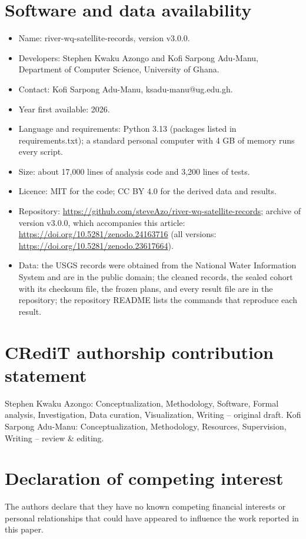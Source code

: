 \section*{Software and data availability}
\begin{itemize}
\item Name: river-wq-satellite-records, version v3.0.0.
\item Developers: Stephen Kwaku Azongo and Kofi Sarpong Adu-Manu, Department of Computer Science, University of Ghana.
\item Contact: Kofi Sarpong Adu-Manu, ksadu-manu@ug.edu.gh.
\item Year first available: 2026.
\item Language and requirements: Python 3.13 (packages listed in requirements.txt); a standard personal computer with 4 GB of memory runs every script.
\item Size: about 17,000 lines of analysis code and 3,200 lines of tests.
\item Licence: MIT for the code; CC BY 4.0 for the derived data and results.
\item Repository: \url{https://github.com/steveAzo/river-wq-satellite-records}; archive of version v3.0.0, which accompanies this article: \url{https://doi.org/10.5281/zenodo.24163716} (all versions: \url{https://doi.org/10.5281/zenodo.23617664}).
\item Data: the USGS records were obtained from the National Water Information System and are in the public domain; the cleaned records, the sealed cohort with its checksum file, the frozen plans, and every result file are in the repository; the repository README lists the commands that reproduce each result.
\end{itemize}

\section*{CRediT authorship contribution statement}
Stephen Kwaku Azongo: Conceptualization, Methodology, Software, Formal analysis, Investigation, Data curation, Visualization, Writing -- original draft. Kofi Sarpong Adu-Manu: Conceptualization, Methodology, Resources, Supervision, Writing -- review \& editing.

\section*{Declaration of competing interest}
The authors declare that they have no known competing financial interests or personal relationships that could have appeared to influence the work reported in this paper.

